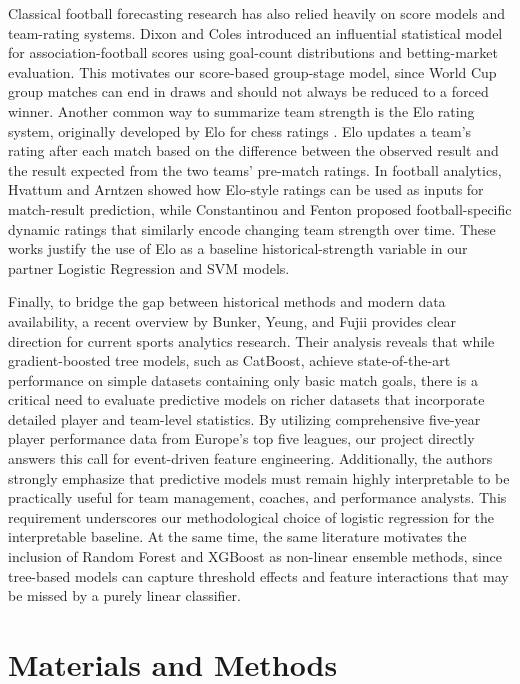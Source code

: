 \documentclass[11pt]{article}
\begin{document}
Classical football forecasting research has also relied heavily on score models and team-rating systems. Dixon and Coles \cite{dixoncoles1997} introduced an influential statistical model for association-football scores using goal-count distributions and betting-market evaluation. This motivates our score-based group-stage model, since World Cup group matches can end in draws and should not always be reduced to a forced winner. Another common way to summarize team strength is the Elo rating system, originally developed by Elo for chess ratings \cite{elo1978}. Elo updates a team's rating after each match based on the difference between the observed result and the result expected from the two teams' pre-match ratings. In football analytics, Hvattum and Arntzen \cite{hvattum2010elo} showed how Elo-style ratings can be used as inputs for match-result prediction, while Constantinou and Fenton \cite{constantinou2013piratings} proposed football-specific dynamic ratings that similarly encode changing team strength over time. These works justify the use of Elo as a baseline historical-strength variable in our partner Logistic Regression and SVM models.

Finally, to bridge the gap between historical methods and modern data availability, a recent overview by Bunker, Yeung, and Fujii \cite{bunker2024machinelearningsoccermatch} provides clear direction for current sports analytics research. Their analysis reveals that while gradient-boosted tree models, such as CatBoost, achieve state-of-the-art performance on simple datasets containing only basic match goals, there is a critical need to evaluate predictive models on richer datasets that incorporate detailed player and team-level statistics. By utilizing comprehensive five-year player performance data from Europe's top five leagues, our project directly answers this call for event-driven feature engineering. Additionally, the authors strongly emphasize that predictive models must remain highly interpretable to be practically useful for team management, coaches, and performance analysts. This requirement underscores our methodological choice of logistic regression for the interpretable baseline. At the same time, the same literature motivates the inclusion of Random Forest and XGBoost as non-linear ensemble methods, since tree-based models can capture threshold effects and feature interactions that may be missed by a purely linear classifier.

\section{Materials and Methods}
\end{document}

